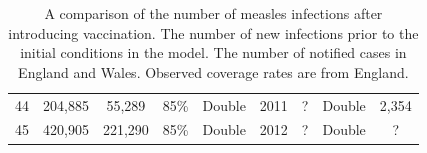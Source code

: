 \documentclass[a4paper,11pt] {scrartcl}
\begin{document}
\begin{table}[hp]
\begin{tabular}{c c c c c | c c c c}
44 & 204,885 & 55,289 & 85\% & Double & 2011 & ? & Double & 2,354\\ 
45 & 420,905 & 221,290 & 85\% & Double & 2012 & ? & Double & ?\\ 
\bottomrule
\end{tabular}
\caption{A comparison of the number of measles infections after introducing vaccination. The number of new infections prior to the initial conditions in the model. The number of notified cases in England and Wales\cite{hpameaslesnotificationsanddeaths,hpameaslesnotificationsbyage}. Observed coverage rates are from England\cite{hpaimmunistationcoverage}.}
\label{tab:priorinitialisationcomparison}
\end{table}
\end{document}
